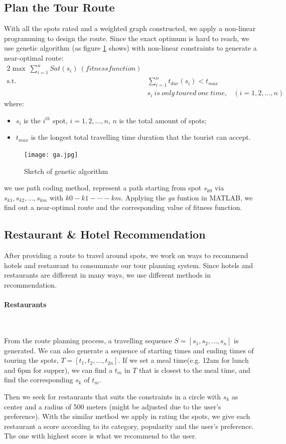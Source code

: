 \documentclass{mcmthesis}
\begin{document}
\subsection{Plan the Tour Route}
  With all the spots rated and a weighted graph constructed, we apply a non-linear programming to design the route. Since the exact optimum is hard to reach, we use genetic algorithm (as figure \ref{fig:ga} shows) with non-linear constraints to generate a near-optimal route:
  \begin{alignat}{2}   %
    \max~\sum_{i=1}^{n}Sat(s_{i})~(fitness function)\\
    \mbox{s.t.}\quad
    &\sum_{i=1}^{n}t_{dur}(s_{i}) < t_{max}\\
    &s_{i}~is~only~toured~one~time, & (i=1,2,\ldots,n)
  \end{alignat}
  where:
  \begin{itemize}
    \item $s_{i}$ is the $i^{th}$ spot, $i=1,2,\ldots,n$, $n$ is the total amount of spots;
    \item $t_{max}$ is the longest total travelling time duration that the tourist can accept.
  \end{itemize}
  \begin{figure}[h]
    \centering
    \texttt{[image: ga.jpg]}
    \caption{Sketch of genetic algorithm}
    \label{fig:ga}
  \end{figure}
  we use path coding method, represent a path starting from spot $s_{k0}$ via $s_{k1}, s_{k2},\ldots,s_{km}$ with $k0-k1-\cdots-km$. Applying the \emph{ga} funtion in MATLAB, we find out a near-optimal route and the corresponding value of fitness function.
 

\subsection{Restaurant \& Hotel Recommendation}
  After providing a route to travel around spots, we work on ways to recommend hotels and restaurant to consummate our tour planning system. Since hotels and restaurants are different in many ways, we use different methods in recommendation.
  \paragraph{Restaurants}\
  
  From the route planning process, a travelling sequence $S = [s_{1}, s_{2}, \ldots, s_{n}]$ is generated. We can also generate a sequence of starting times and ending times of touring the spots, $T = [t_{1}, t_{2}, \ldots, t_{2n}]$. If we set a meal time(e.g. 12am for lunch and 6pm for supper), we can find a $t_{m}$ in $T$ that is closest to the meal time, and find the corresponding $s_{k}$ of $t_{m}$. \par
  Then we seek for restaurants that suits the constraints in a circle with $s_{k}$ as center and a radius of 500 meters (might be adjusted due to the user's preference). With the similar method we apply in rating the spots, we give each restaurant a score according to its category, popularity and the user's preference. The one with highest score is what we recommend to the user.
\end{document}
